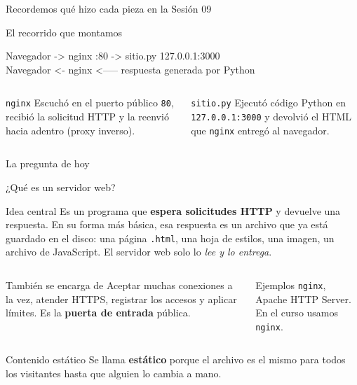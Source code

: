 \documentclass[aspectratio=169,10pt,c]{beamer}
\begin{document}
\begin{frame}{Recordemos qué hizo cada pieza en la Sesión 09}
\begin{exampleblock}{El recorrido que montamos}
\begin{terminal}\footnotesize
Navegador -> nginx :80 -> sitio.py 127.0.0.1:3000\\
Navegador <- nginx <----- respuesta generada por Python
\end{terminal}
\end{exampleblock}
\begin{columns}[T,onlytextwidth]
\begin{block}{\texttt{nginx}}
\small Escuchó en el puerto público \texttt{80}, recibió la solicitud HTTP y la reenvió hacia adentro (proxy inverso).
\end{block}
\begin{block}{\texttt{sitio.py}}
\small Ejecutó código Python en \texttt{127.0.0.1:3000} y devolvió el HTML que \texttt{nginx} entregó al navegador.
\end{block}
\end{columns}
\begin{alertblock}{La pregunta de hoy}
\end{alertblock}
\end{frame}

\begin{frame}{¿Qué es un servidor web?}
\begin{block}{Idea central}
\small Es un programa que \textbf{espera solicitudes HTTP} y devuelve una respuesta. En su forma más básica, esa respuesta es un archivo que ya está guardado en el disco: una página \texttt{.html}, una hoja de estilos, una imagen, un archivo de JavaScript. El servidor web solo lo \emph{lee y lo entrega}.
\end{block}
\begin{columns}[T,onlytextwidth]
\begin{exampleblock}{También se encarga de}
\small Aceptar muchas conexiones a la vez, atender HTTPS, registrar los accesos y aplicar límites. Es la \textbf{puerta de entrada} pública.
\end{exampleblock}
\begin{exampleblock}{Ejemplos}
\small \texttt{nginx}, Apache HTTP Server. En el curso usamos \texttt{nginx}.
\end{exampleblock}
\end{columns}
\begin{block}{Contenido estático}
\small Se llama \textbf{estático} porque el archivo es el mismo para todos los visitantes hasta que alguien lo cambia a mano.
\end{block}
\end{frame}
\end{document}
